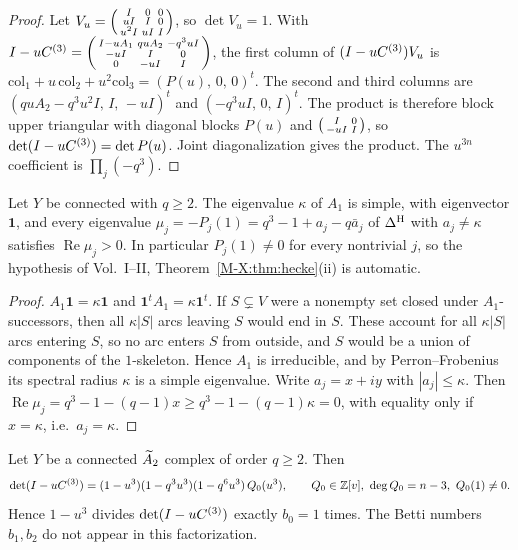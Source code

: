 \begin{proof}
Let $V_u=\begin{psmallmatrix}I&0&0\\uI&I&0\\u^{2}I&uI&I\end{psmallmatrix}$, so
$\det V_u=1$. With
$I-uC^{(3)}=\begin{psmallmatrix}I-uA_1&quA_2&-q^{3}uI\\-uI&I&0\\0&-uI&I\end{psmallmatrix}$,
the first column of $(I-uC^{(3)})V_u$ is
$\mathrm{col}_1+u\,\mathrm{col}_2+u^{2}\mathrm{col}_3=(P(u),\,0,\,0)^{t}$. The second and
third columns are $(quA_2-q^{3}u^{2}I,\,I,\,-uI)^{t}$ and $(-q^{3}uI,\,0,\,I)^{t}$. The
product is therefore block upper triangular with diagonal blocks $P(u)$ and
$\begin{psmallmatrix}I&0\\-uI&I\end{psmallmatrix}$, so $\det(I-uC^{(3)})=\det P(u)$. Joint
diagonalization gives the product. The $u^{3n}$ coefficient is $\prod_j(-q^{3})$.
\end{proof}

\begin{lemma}\label{V3P1:lem:sector}
Let $Y$ be connected with $q\ge2$. The eigenvalue $\kappa$ of $A_1$ is simple, with
eigenvector $\mathbf 1$, and every eigenvalue $\mu_j=-P_j(1)=q^{3}-1+a_j-q\bar a_j$ of
$\Delta^{\mathrm{H}}$ with $a_j\neq\kappa$ satisfies $\operatorname{Re}\mu_j>0$. In particular
$P_j(1)\neq0$ for every nontrivial $j$, so the hypothesis of Vol.~I--II, Theorem~\ref{M-X:thm:hecke}(ii) is
automatic.
\end{lemma}

\begin{proof}
$A_1\mathbf 1=\kappa\mathbf 1$ and $\mathbf 1^{t}A_1=\kappa\mathbf 1^{t}$. If $S\subsetneq V$
were a nonempty set closed under $A_1$-successors, then all $\kappa|S|$ arcs leaving $S$ would
end in $S$. These account for all $\kappa|S|$ arcs entering $S$, so no arc enters $S$ from
outside, and $S$ would be a union of components of the $1$-skeleton. Hence $A_1$ is
irreducible, and by Perron--Frobenius its spectral radius $\kappa$ is a simple eigenvalue.
Write $a_j=x+iy$ with $|a_j|\le\kappa$. Then
$\operatorname{Re}\mu_j=q^{3}-1-(q-1)x\ge q^{3}-1-(q-1)\kappa=0$, with equality only if
$x=\kappa$, i.e.\ $a_j=\kappa$.
\end{proof}

\begin{theorem}\label{V3P1:thm:orbit}
Let $Y$ be a connected $\widetilde A_2$ complex of order $q\ge2$. Then
\[
\det(I-uC^{(3)})=(1-u^{3})(1-q^{3}u^{3})(1-q^{6}u^{3})\,Q_0(u^{3}),
\qquad Q_0\in\mathbb{Z}[v],\ \deg Q_0=n-3,\ Q_0(1)\neq0 .
\]
Hence $1-u^{3}$ divides $\det(I-uC^{(3)})$ exactly $b_0=1$ times. The Betti numbers $b_1,b_2$
do not appear in this factorization.
\end{theorem}

